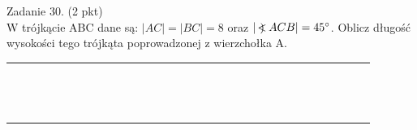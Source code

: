 \documentclass[10pt]{article}
\newcommand\Varangle{\mathop{{<\!\!\!\!\!\text{\small)}}\:}\nolimits}
\begin{document}
Zadanie 30. (2 pkt)\\
W trójkącie ABC dane są: \(|A C|=|B C|=8\) oraz \(|\Varangle A C B|=45^{\circ}\). Oblicz długość wysokości tego trójkąta poprowadzonej z wierzchołka A.

\begin{center}
\begin{tabular}{|c|c|c|c|c|c|c|c|c|c|c|c|c|c|c|c|c|c|c|c|c|c|c|c|c|c|c|c|c|c|c|c|}
\hline
 &  &  &  &  &  &  &  &  &  &  &  &  &  &  &  &  &  &  &  &  &  &  &  &  &  &  &  &  &  &  &  \\
\hline
 &  &  &  &  &  &  &  &  &  &  &  &  &  &  &  &  &  &  &  &  &  &  &  &  &  &  &  &  &  &  &  \\
\hline
 &  &  &  &  &  &  &  &  &  &  &  &  &  &  &  &  &  &  &  &  &  &  &  &  &  &  &  &  &  &  &  \\
\hline
 &  &  &  &  &  &  &  &  &  &  &  &  &  &  &  &  &  &  &  &  &  &  &  &  &  &  &  &  &  &  &  \\
\hline
 &  &  &  &  &  &  &  &  &  &  &  &  &  &  &  &  &  &  &  &  &  &  &  &  &  &  &  &  &  &  &  \\
\hline
 &  &  &  &  &  &  &  &  &  &  &  &  &  &  &  &  &  &  &  &  &  &  &  &  &  &  &  &  &  &  &  \\
\hline
 &  &  &  &  &  &  &  &  &  &  &  &  &  &  &  &  &  &  &  &  &  &  &  &  &  &  &  &  &  &  &  \\
\hline
 &  &  &  &  &  &  &  &  &  &  &  &  &  &  &  &  &  &  &  &  &  &  &  &  &  &  &  &  &  &  &  \\
\hline
 &  &  &  &  &  &  &  &  &  &  &  &  &  &  &  &  &  &  &  &  &  &  &  &  &  &  &  &  &  &  &  \\
\hline
 &  &  &  &  &  &  &  &  &  &  &  &  &  &  &  &  &  &  &  &  &  &  &  &  &  &  &  &  &  &  &  \\
\hline
 &  &  &  &  &  &  &  &  &  &  &  &  &  &  &  &  &  &  &  &  &  &  &  &  &  &  &  &  &  &  &  \\
\hline
 &  &  &  &  &  &  &  &  &  &  &  &  &  &  &  &  &  &  &  &  &  &  &  &  &  &  &  &  &  &  &  \\
\hline
 &  &  &  &  &  &  &  &  &  &  &  &  &  &  &  &  &  &  &  &  &  &  &  &  &  &  &  &  &  &  &  \\
\hline
 &  &  &  &  &  &  &  &  &  &  &  &  &  &  &  &  &  &  &  &  &  &  &  &  &  &  &  &  &  &  &  \\
\hline
 &  &  &  &  &  &  &  &  &  &  &  &  &  &  &  &  &  &  &  &  &  &  &  &  &  &  &  &  &  &  &  \\
\hline

\end{tabular}
\end{center}
\end{document}
